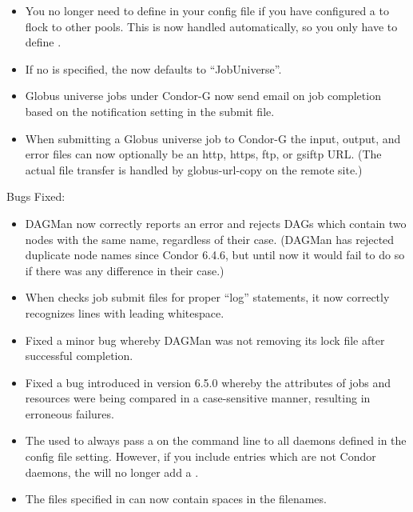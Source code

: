 \begin{itemize}
\item You no longer need to define  in
  your config file if you have configured a  to flock
  to other pools.
  This is now handled automatically, so you only have to define
  .

\item If no  is specified, the 
  now defaults to ``JobUniverse''.

\item Globus universe jobs under Condor-G now send email on job
completion based on the notification setting in the submit file.

\item When submitting a Globus universe job to Condor-G the
input, output, and error files can now optionally be an http,
https, ftp, or gsiftp URL.  (The actual file transfer is handled
by globus-url-copy on the remote site.)

\end{itemize}

\noindent Bugs Fixed:
\begin{itemize}

\item DAGMan now correctly reports an error and rejects DAGs which
      contain two nodes with the same name, regardless of their case.
      (DAGMan has rejected duplicate node names since Condor 6.4.6,
      but until now it would fail to do so if there was any difference
      in their case.)

\item When  checks job submit files for proper
      ``log'' statements, it now correctly recognizes lines with
      leading whitespace.

\item Fixed a minor bug whereby DAGMan was not removing its lock file
      after successful completion.

\item Fixed a bug introduced in version 6.5.0 whereby the
       attributes of jobs and resources were being
      compared in a case-sensitive manner, resulting in erroneous
      failures.

\item The  used to always pass a  on the
  command line to all daemons defined in the 
  config file setting.
  However, if you include entries which are not Condor daemons, the
   will no longer add a .

\item The files specified in  can now
  contain spaces in the filenames.

\end{itemize}


